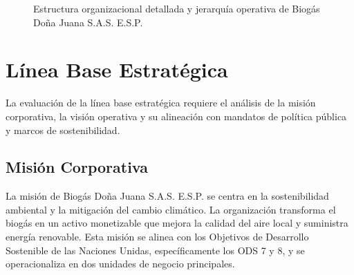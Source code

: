 \documentclass[11pt,letterpaper]{article}
\begin{document}
\begin{figure}[htbp] \centering {}
  \caption{Estructura organizacional detallada y jerarquía operativa de Biogás
  Doña Juana S.A.S.  E.S.P.}
  \label{fig:organigrama}
\end{figure}

\newpage

\section{Línea Base Estratégica}

La evaluación de la línea base estratégica requiere el análisis de la misión
corporativa, la visión operativa y su alineación con mandatos de política
pública y marcos de sostenibilidad.

\subsection{Misión Corporativa}

La misión de Biogás Doña Juana S.A.S.  E.S.P. se centra en la sostenibilidad
ambiental y la mitigación del cambio climático. La organización transforma el
biogás en un activo monetizable que mejora la calidad del aire local y
suministra energía renovable. Esta misión se alinea con los Objetivos de
Desarrollo Sostenible de las Naciones Unidas, específicamente los ODS 7 y 8, y
se operacionaliza en dos unidades de negocio principales.
\end{document}
